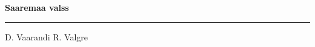 \documentclass[10pt]{book}
\begin{document}
{
  \samepage
  \raggedbottom
  \raggedright
  \sloppy


  \vspace{0.2in}

  \noindent\begin{minipage}{.1\textwidth}
    \hfill\vspace{0.1in}
  \end{minipage}%
  \noindent\begin{minipage}{.8\textwidth}
    \centering
    \bfseries
    \large Saaremaa valss
  \end{minipage}%
  \noindent\begin{minipage}{.1\textwidth}
      \hfill\vspace{0.1in}
  \end{minipage}

  \nopagebreak[4]
  \vspace{0.1in}
  \nopagebreak[4]
  \hrule height 0.05ex
  \nopagebreak[4]
  \vspace{-0.05in}

  {\footnotesize D. Vaarandi \hfill R. Valgre }\\
  \vspace{0.01in}



}
\end{document}
